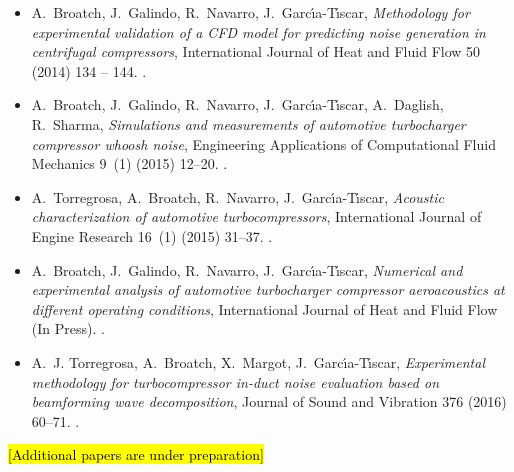 \documentclass[final,twoside,11pt]{book}
\numberwithin{equation}{section}
\numberwithin{figure}{chapter}
\numberwithin{table}{chapter}
\begin{document}
\begin{itemize}

  \item \nocite{broatch2014methodology}
  A.~Broatch, J.~Galindo, R.~Navarro, J.~Garc{\'\i}a-T{\'\i}scar, \emph{Methodology for experimental validation of a CFD model for predicting noise generation in centrifugal compressors}, International Journal of Heat and Fluid Flow 50  (2014) 134 -- 144. \newblock \href {http://dx.doi.org/10.1016/j.ijheatfluidflow.2014.06.006}{}.

  \item \nocite{broatch2015simulations}
  A.~Broatch, J.~Galindo, R.~Navarro, J.~Garc{\'\i}a-T{\'\i}scar, A.~Daglish, R.~Sharma, \emph{Simulations and measurements of automotive turbocharger compressor whoosh noise}, Engineering Applications of Computational Fluid Mechanics 9~(1) (2015) 12--20. \newblock \href {http://dx.doi.org/10.1080/19942060.2015.1004788}{}.

  \item \nocite{torregrosa2014aco}
  A.~Torregrosa, A.~Broatch, R.~Navarro, J.~Garc{\'\i}a-T{\'\i}scar, \emph{Acoustic characterization of automotive turbocompressors}, International Journal of Engine Research 16~(1) (2015) 31--37. \newblock \href {http://dx.doi.org/10.1177/1468087414562866}{}.

  \item \nocite{broatch2016numerical}
  A.~Broatch, J.~Galindo, R.~Navarro, J.~Garc{\'\i}a-T{\'\i}scar, \emph{Numerical and experimental analysis of automotive turbocharger compressor aeroacoustics at different operating conditions}, International Journal of Heat and Fluid Flow (In Press). \newblock \href {http://dx.doi.org/10.1016/j.ijheatfluidflow.2016.04.003}{}.

  \item \nocite{torregrosa2016experimental}
  A.~J. Torregrosa, A.~Broatch, X.~Margot, J.~Garc{\'\i}a-T{\'\i}scar, \emph{Experimental methodology for turbocompressor in-duct noise evaluation based on beamforming wave decomposition}, Journal of Sound and Vibration 376 (2016) 60--71. \newblock \href {http://dx.doi.org/10.1016/j.jsv.2016.04.035}{}.

\end{itemize}

\hl{[Additional papers are under preparation]}
\end{document}
